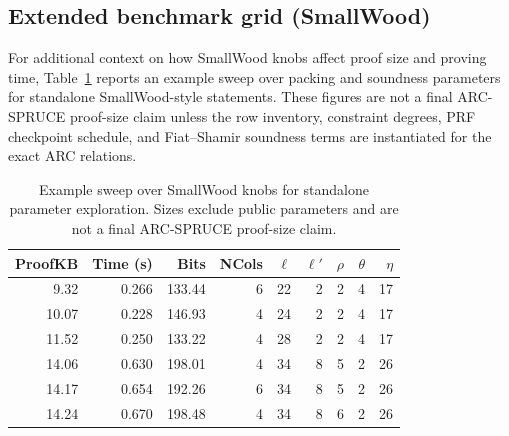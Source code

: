 \subsection{Extended benchmark grid (SmallWood)}
For additional context on how SmallWood knobs affect proof size and proving time, Table~\ref{tab:results-grid}
reports an example sweep over packing and soundness parameters for standalone SmallWood-style statements.  These
figures are not a final ARC-SPRUCE proof-size claim unless the row inventory, constraint degrees, PRF checkpoint
schedule, and Fiat--Shamir soundness terms are instantiated for the exact ARC relations.

\begin{table}[H]
\centering
\footnotesize
\setlength{\tabcolsep}{4pt}
\begin{tabular}{r r r r r r r r r}
\toprule
\textbf{ProofKB} & \textbf{Time (s)} & \textbf{Bits} & \textbf{NCols} & \(\ell\) & \(\ell'\) & \(\rho\) & \(\theta\) & \(\eta\)\\
\midrule
\ \ 9.32 & 0.266 & 133.44 & 6 & 22 & 2 & 2 & 4 & 17 \\
10.07 & 0.228 & 146.93 & 4 & 24 & 2 & 2 & 4 & 17 \\
11.52 & 0.250 & 133.22 & 4 & 28 & 2 & 2 & 4 & 17 \\
\midrule[1.2pt]
14.06 & 0.630 & 198.01 & 4 & 34 & 8 & 5 & 2 & 26 \\
14.17 & 0.654 & 192.26 & 6 & 34 & 8 & 5 & 2 & 26 \\
14.24 & 0.670 & 198.48 & 4 & 34 & 8 & 6 & 2 & 26 \\
\bottomrule
\end{tabular}
\caption{Example sweep over SmallWood knobs for standalone parameter exploration.  Sizes exclude public
parameters and are not a final ARC-SPRUCE proof-size claim.}
\label{tab:results-grid}
\end{table}
